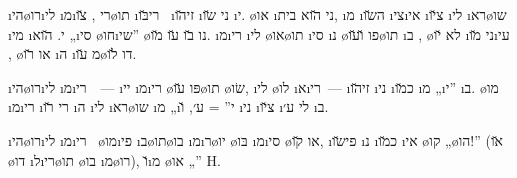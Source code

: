 \i{הי}\o{רו}\i{לי} \i{מ}\i{רי} , \u{צו}\o{תו} \i{רי}\u{בּו}~ \i{זי}\u{הו} \i{ני}  \u{שו}  \i{י}.  \o{או} \i{ני} \u{הוא} בית,   \i{מ}  \i{ה}\u{שו} \i{צי}\i{אי} \i{צ}\u{יו}     \i{לי} \i{רא}\o{שו}  \i{מי} \i{י}.    \u{הוא} „\i{סי} \o{חו}\i{שי}” \o{נו} \u{בו} \u{עו} \u{מו}. \i{מ}\i{רי} \i{לי}  \o{או}\o{תו} \i{סי}  \i{נ} \o{פו} \u{ו}\u{עו}\o{תו}  \i{ב} ,    \o{לא} \u{יו} \i{ני} \u{מו}\i{עי} , \o{או} \u{רו} \i{ה} \i{מ} \u{עו}\o{דו} \u{לו}.

 \i{הי}\o{רו}\i{לי} \i{מ}\i{רי}~~— \i{יי} \i{מ}\i{רי}  \o{פּו} \u{עו}\o{תו}  \o{שׂו}, \i{לי} \o{לו}  \i{א}\i{רי}~— \i{זי}\u{הו} \i{ני} \i{כ}\u{מו}  \i{מ} „\i{י}” \i{ב}. \o{מו} \i{מ}\i{רי} \i{רי}  \u{רו} \i{ה}  \i{לי} \i{רא}\o{שו}  \i{מ} „\i{י}” = ע׳, \u{ו} \i{ני}  \i{צ}\u{יו}  \i{לי} ע׳ \i{ב}.

 \i{הי}\o{רו}\i{לי} \i{מ}\i{רי}~ \o{מו}\i{פי} \i{ב}\o{תו}\o{בו} \i{מ}\i{ר}\o{יו} \o{בּו} \i{מ}\i{סי} \o{או} \u{קו},  \i{פי}\u{שו} \i{נ} \i{כ}\u{מו}  \i{אי} \o{קו} „\o{הו}!” (\u{או} \o{דו} \i{ל}\i{רי}\o{תו}   \o{בו} \i{מ}\o{רו}), \u{ו}\i{מ}   \o{או} „” {H}.

